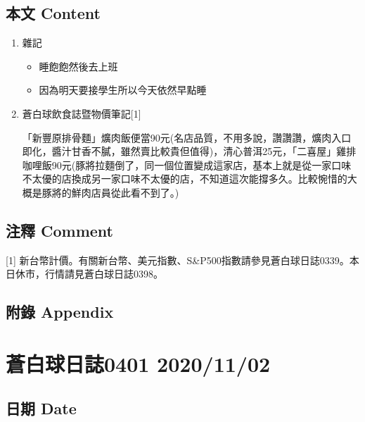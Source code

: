 \documentclass[
]{article}
\providecommand{\tightlist}{%
  \setlength{\itemsep}{0pt}\setlength{\parskip}{0pt}}
\begin{document}
\hypertarget{ux672cux6587-content-58}{%
\subsection{本文 Content}\label{ux672cux6587-content-58}}

\begin{enumerate}
\def\labelenumi{\arabic{enumi}.}
\item
  雜記

  \begin{itemize}
  \tightlist
  \item
    睡飽飽然後去上班
  \item
    因為明天要接學生所以今天依然早點睡
  \end{itemize}
\item
  蒼白球飲食誌暨物價筆記{[}1{]}

  「新豐原排骨麵」爌肉飯便當90元(名店品質，不用多說，讚讚讚，爌肉入口即化，醬汁甘香不膩，雖然賣比較貴但值得)，清心普洱25元，「二喜屋」雞排咖哩飯90元(豚將拉麵倒了，同一個位置變成這家店，基本上就是從一家口味不太優的店換成另一家口味不太優的店，不知道這次能撐多久。比較惋惜的大概是豚將的鮮肉店員從此看不到了。)
\end{enumerate}

\hypertarget{ux6ce8ux91cb-comment-58}{%
\subsection{注釋 Comment}\label{ux6ce8ux91cb-comment-58}}

{[}1{]}
新台幣計價。有關新台幣、美元指數、S\&P500指數請參見蒼白球日誌0339。本日休市，行情請見蒼白球日誌0398。

\hypertarget{ux9644ux9304-appendix-58}{%
\subsection{附錄 Appendix}\label{ux9644ux9304-appendix-58}}

\hypertarget{ux84bcux767dux7403ux65e5ux8a8c0401-20201102}{%
\section{蒼白球日誌0401
2020/11/02}\label{ux84bcux767dux7403ux65e5ux8a8c0401-20201102}}

\hypertarget{ux65e5ux671f-date-59}{%
\subsection{日期 Date}\label{ux65e5ux671f-date-59}}
\end{document}
